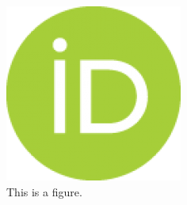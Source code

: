 \documentclass{article}
\begin{document}
\begin{figure}[htbp]
    \centering
    \includegraphics{orcid-ID.png}
    \caption{This is a figure.}
    \label{fig:a-figure}
\end{figure}
\end{document}
